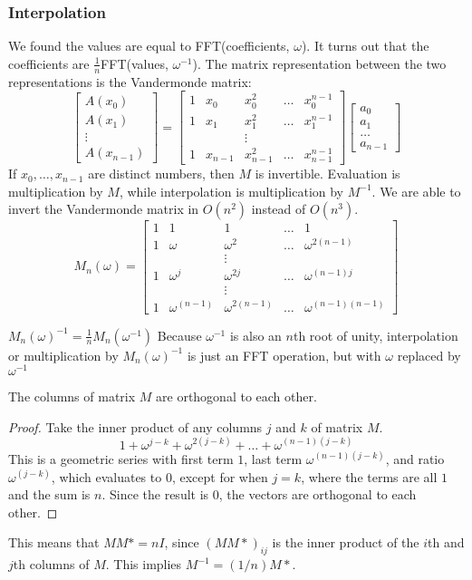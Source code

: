 \subsubsection{Interpolation}
We found the values are equal to FFT(coefficients, $\omega$).
It turns out that the coefficients are $\frac{1}{n}$FFT(values, $\omega^{-1}$).
The matrix representation between the two representations is the Vandermonde matrix:
\[\begin{bmatrix}A(x_0) \\ A(x_1) \\ \vdots \\ A(x_{n-1}) \end{bmatrix}
= 
\begin{bmatrix} 1 & x_0 & x_0^2 & \dots & x_0^{n-1} \\
1 & x_1 & x_1^2 & \dots & x_1^{n-1} \\
& & \vdots \\
1 & x_{n-1} & x_{n-1}^2 & \dots & x_{n-1}^{n-1}
\end{bmatrix}
\begin{bmatrix}
a_0 \\ a_1 \\ \dots \\ a_{n-1}
\end{bmatrix}\]
If $x_0, \dots, x_{n-1}$ are distinct numbers, then $M$ is invertible.
Evaluation is multiplication by $M$, while interpolation is multiplication by $M^{-1}$.
  We are able to invert the Vandermonde matrix in $O(n^2)$ instead of $O(n^3)$.
  \[M_n(\omega) = \begin{bmatrix} 1 & 1 & 1 & \dots & 1 \\
1 & \omega & \omega^2 & \dots & \omega^{2(n-1)} \\
& & \vdots \\
1 & \omega^j & \omega^{2j} & \dots & \omega^{(n-1)j} \\
& & \vdots \\
1 & \omega^{(n-1)} & \omega^{2(n-1)} & \dots & \omega^{(n-1)(n-1)}
\end{bmatrix}\]

\begin{thm}
  $M_n(\omega)^{-1} = \frac{1}{n}M_n(\omega^{-1})$
  Because $\omega^{-1}$ is also an $n$th root of unity, interpolation or multiplication by $M_n(\omega)^{-1}$ is just an FFT operation, but with $\omega$ replaced by $\omega^{-1}$
\end{thm}
\begin{lemma}
  The columns of matrix $M$ are orthogonal to each other.
\end{lemma}
\begin{proof}
  Take the inner product of any columns $j$ and $k$ of matrix $M$.
  \[1 + \omega^{j-k} + \omega^{2(j-k)} + \dots + \omega^{(n-1)(j-k)}\]
  This is a geometric series with first term $1$, last term $\omega^{(n-1)(j-k)}$, and ratio $\omega^{(j-k)}$, which evaluates to $0$, except for when $j = k$, where the terms are all $1$ and the sum is $n$.
  Since the result is $0$, the vectors are orthogonal to each other.
\end{proof}
This means that $MM*=nI$, since $(MM*)_{ij}$ is the inner product of the $i$th and $j$th columns of $M$.
This implies $M^{-1} = (1/n) M*$.


